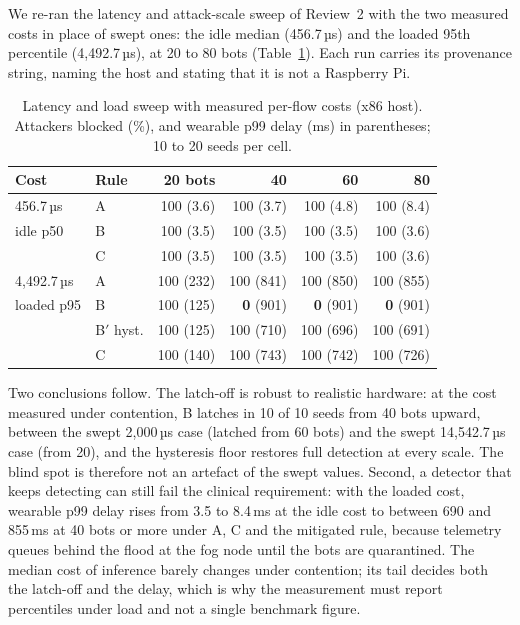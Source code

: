 \noindent We re-ran the latency and attack-scale sweep of Review~2 with the two measured costs in place of swept ones: the idle median (456.7\,µs) and the loaded 95th percentile (4,492.7\,µs), at 20 to 80 bots (Table~\ref{tab:measured}). Each run carries its provenance string, naming the host and stating that it is not a Raspberry Pi.

\begin{table}[t]
\caption{Latency and load sweep with measured per-flow costs (x86 host). Attackers blocked (\%), and wearable p99 delay (ms) in parentheses; 10 to 20 seeds per cell.}
\label{tab:measured}
\centering\footnotesize
\begin{tabular}{@{}llrrrr@{}}
\toprule
\textbf{Cost} & \textbf{Rule} & \textbf{20 bots} & \textbf{40} & \textbf{60} & \textbf{80} \\
\midrule
456.7\,µs & A & 100 (3.6) & 100 (3.7) & 100 (4.8) & 100 (8.4) \\
idle p50 & B & 100 (3.5) & 100 (3.5) & 100 (3.5) & 100 (3.6) \\
& C & 100 (3.5) & 100 (3.5) & 100 (3.5) & 100 (3.6) \\
\midrule
4,492.7\,µs & A & 100 (232) & 100 (841) & 100 (850) & 100 (855) \\
loaded p95 & B & 100 (125) & \textbf{0} (901) & \textbf{0} (901) & \textbf{0} (901) \\
& B$'$ hyst. & 100 (125) & 100 (710) & 100 (696) & 100 (691) \\
& C & 100 (140) & 100 (743) & 100 (742) & 100 (726) \\
\bottomrule
\end{tabular}
\end{table}

\noindent Two conclusions follow. The latch-off is robust to realistic hardware: at the cost measured under contention, B latches in 10 of 10 seeds from 40 bots upward, between the swept 2,000\,µs case (latched from 60 bots) and the swept 14,542.7\,µs case (from 20), and the hysteresis floor restores full detection at every scale. The blind spot is therefore not an artefact of the swept values. Second, a detector that keeps detecting can still fail the clinical requirement: with the loaded cost, wearable p99 delay rises from 3.5 to 8.4\,ms at the idle cost to between 690 and 855\,ms at 40 bots or more under A, C and the mitigated rule, because telemetry queues behind the flood at the fog node until the bots are quarantined. The median cost of inference barely changes under contention; its tail decides both the latch-off and the delay, which is why the measurement must report percentiles under load and not a single benchmark figure.
